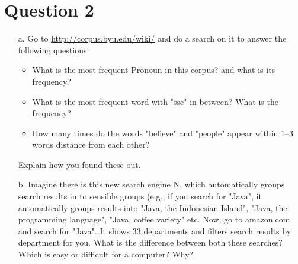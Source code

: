 \documentclass[11pt,a4paper]{article}
\begin{document}
\section*{Question 2}
\begin{enumerate}
\item[a.] Go to \url{http://corpus.byu.edu/wiki/} and do a search on it to answer the following questions: 
\begin{itemize}
\item What is the most frequent Pronoun in this corpus? and what is its frequency?
 \item What is the most frequent word with "sse" in between? What is the frequency?
 \item How many times do the words "believe" and "people" appear within 1--3 words distance from each other? 
\end{itemize}
Explain how you found these out.

\item[b.] Imagine there is this new search engine N, which automatically groups search results in to sensible groups (e.g., if you search for "Java", it automatically groups results into "Java, the Indonesian Island", "Java, the programming language", "Java, coffee variety" etc. Now, go to amazon.com and search for "Java". It shows 33 departments and filters search results by department for you. What is the difference between both these searches? Which is easy or difficult for a computer? Why?
\end{enumerate}
\end{document}
